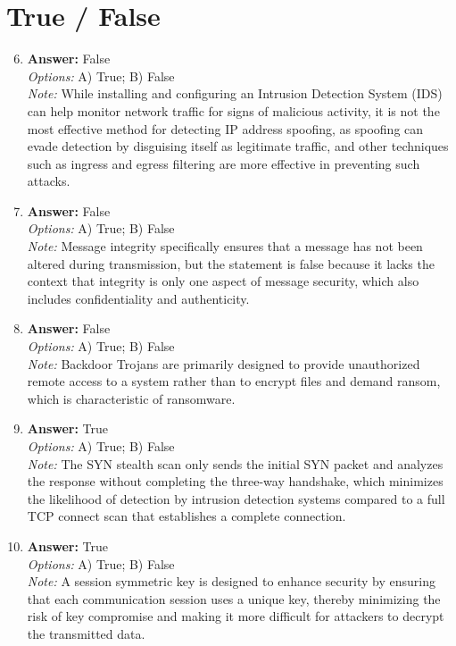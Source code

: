 \documentclass[12pt]{article}
\begin{document}
\section*{True / False}
\begin{enumerate}[label=\arabic*.]
\setcounter{enumi}{5}
\item \textbf{Answer:} False
\\ \textit{Options:} A) True; B) False
\\ \textit{Note:} While installing and configuring an Intrusion Detection System (IDS) can help monitor network traffic for signs of malicious activity, it is not the most effective method for detecting IP address spoofing, as spoofing can evade detection by disguising itself as legitimate traffic, and other techniques such as ingress and egress filtering are more effective in preventing such attacks.
\item \textbf{Answer:} False
\\ \textit{Options:} A) True; B) False
\\ \textit{Note:} Message integrity specifically ensures that a message has not been altered during transmission, but the statement is false because it lacks the context that integrity is only one aspect of message security, which also includes confidentiality and authenticity.
\item \textbf{Answer:} False
\\ \textit{Options:} A) True; B) False
\\ \textit{Note:} Backdoor Trojans are primarily designed to provide unauthorized remote access to a system rather than to encrypt files and demand ransom, which is characteristic of ransomware.
\item \textbf{Answer:} True
\\ \textit{Options:} A) True; B) False
\\ \textit{Note:} The SYN stealth scan only sends the initial SYN packet and analyzes the response without completing the three-way handshake, which minimizes the likelihood of detection by intrusion detection systems compared to a full TCP connect scan that establishes a complete connection.
\item \textbf{Answer:} True
\\ \textit{Options:} A) True; B) False
\\ \textit{Note:} A session symmetric key is designed to enhance security by ensuring that each communication session uses a unique key, thereby minimizing the risk of key compromise and making it more difficult for attackers to decrypt the transmitted data.
\end{enumerate}
\end{document}

